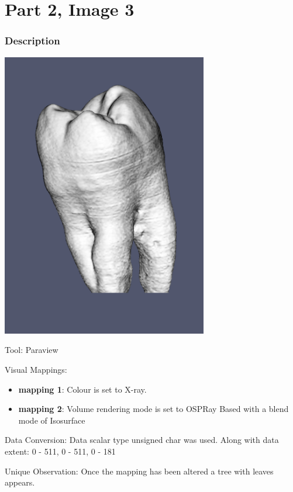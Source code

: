 \hypertarget{part-2-image-3}{%
\section{Part 2, Image 3}\label{part-1-design-2}}

\centering


\hypertarget{description}{%
	\subsubsection{Description}\label{description}}

\begin{description}
	\item[Image:]
	\item\includegraphics[width=9cm]{Tooth3.png}
		\begin{flushleft}
	\item[Tool:]
	Paraview
	\item[Visual Mappings:]
	\begin{itemize}
		\tightlist
		\item[ ]
	\end{itemize}
	\begin{itemize}
		\tightlist
		\item
		\textbf{mapping 1}: Colour is set to X-ray.
	\end{itemize}
	
	\begin{itemize}
		\tightlist
		\item
		\textbf{mapping 2}: Volume rendering mode is set to OSPRay Based with a blend mode of Isosurface
	\end{itemize}
	\item[Data Conversion:] Data scalar type unsigned char was used. Along with data extent: 0 - 511, 0 - 511, 0 - 181
	\item[Unique Observation:]
	Once the mapping has been altered a tree with leaves appears.

\end{flushleft}	
\end{description}